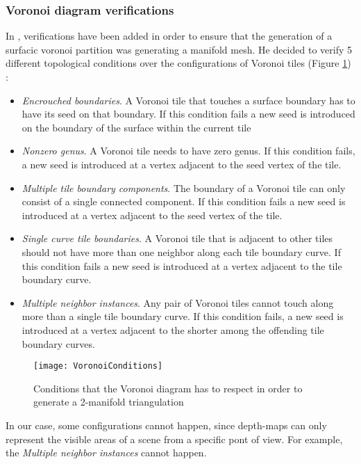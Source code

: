 \documentclass[11pt,fleqn]{book} %
\begin{document}
\subsubsection{Voronoi diagram verifications}
In \cite{Gus07}, verifications have been added in order to ensure that the generation of a surfacic voronoi partition was generating a manifold mesh.
He decided to verify 5 different topological conditions over the configurations of Voronoi tiles (Figure \ref{fig:voronoi_conditions}) : 
\begin{itemize}
	\item \textit{Encrouched boundaries}. A Voronoi tile that touches a surface boundary has to have its seed on that boundary. 
	If this condition fails a new seed is introduced on the boundary of the surface within the current tile
	\item \textit{Nonzero genus}. A Voronoi tile needs to have zero genus. If this condition fails, a new seed is introduced at a vertex adjacent to the seed vertex of the tile.
	\item \textit{Multiple tile boundary components}. The boundary of a Voronoi tile can only consist of a single connected component. If this condition fails a new seed is introduced at a vertex adjacent to the seed vertex of the tile.
	\item \textit{Single curve tile boundaries}. A Voronoi tile that is adjacent to other tiles should not have more than one neighbor along each tile boundary curve. If this condition fails a new seed is introduced at a vertex adjacent to the tile boundary curve.
	\item \textit{Multiple neighbor instances}. Any pair of Voronoi tiles cannot touch along more than a single tile boundary curve. If this condition fails, a new seed is introduced at a vertex adjacent to the shorter among the offending tile boundary curves.
\end{itemize}

\begin{figure}[ht]
\centering\texttt{[image: VoronoiConditions]}
\caption{Conditions that the Voronoi diagram has to respect in order to generate a 2-manifold triangulation \cite{Gus07}}
\label{fig:voronoi_conditions}
\end{figure}

In our case, some configurations cannot happen, since depth-maps can only represent the visible areas of a scene from a specific pont of view.
For example, the \textit{Multiple neighbor instances} cannot happen.
\end{document}
